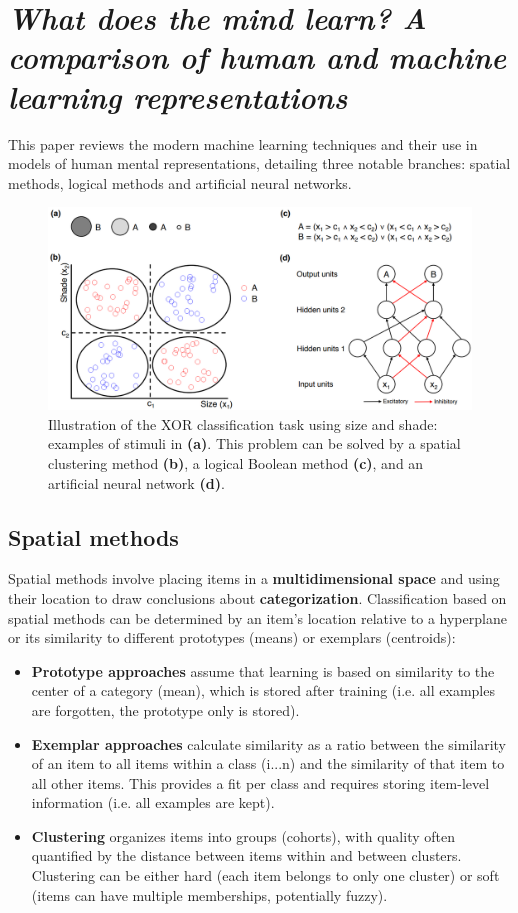 \section[Spatial methods, Logical methods and Artificial neural networks]{\textit{What does the mind learn? A comparison of human and machine learning representations}\\ }

This paper reviews the modern machine learning techniques and their use in models of human mental representations, detailing three notable branches: spatial methods, logical methods and artificial neural networks.
\begin{figure}[ht]
    \centering
    \captionsetup{width=.8\linewidth}
    \includegraphics[width=0.75\linewidth]{images/xor.png}
    \caption{Illustration of the XOR classification task using size and shade: examples of stimuli in \textbf{(a)}. This problem can be solved by a spatial clustering method \textbf{(b)}, a logical Boolean method \textbf{(c)}, and an artificial neural network \textbf{(d)}.}
\end{figure}

\subsection{Spatial methods}
Spatial methods involve placing items in a \textbf{multidimensional space} and using their location to draw conclusions about \textbf{categorization}.
Classification based on spatial methods can be determined by an item's location relative to a hyperplane or its similarity to different prototypes (means) or exemplars (centroids):
\begin{itemize}
    \item \textbf{Prototype approaches} assume that learning is based on similarity to the center of a category (mean), which is stored after training (i.e. all examples are forgotten, the prototype only is stored).
    \item \textbf{Exemplar approaches} calculate similarity as a ratio between the similarity of an item to all items within a class (i...n) and the similarity of that item to all other items. This provides a fit per class and requires storing item-level information (i.e. all examples are kept).
    \item \textbf{Clustering} organizes items into groups (cohorts), with quality often quantified by the distance between items within and between clusters. Clustering can be either hard (each item belongs to only one cluster) or soft (items can have multiple memberships, potentially fuzzy).
\end{itemize}

